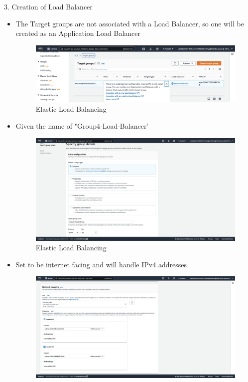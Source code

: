 3. Creation of Load Balancer

\begin{itemize}
    \item The Target groups are not associated with a Load Balancer, so one will be created as an Application Load Balancer
    \begin{figure}[!htbp]
        \centering
        \includegraphics[width=\textwidth]{resources/elb/elb-load-balancer-creation.png}
        \caption{Elastic Load Balancing}
        \label{fig:elb-load-bal-create}
    \end{figure}
    \item Given the name of "Group4-Load-Balancer' \begin{figure}[!htbp]
                                                       \centering
                                                       \includegraphics[width=\textwidth]{resources/elb/elb-target-group-basic-config.png}
                                                       \caption{Elastic Load Balancing}
                                                       \label{fig:elb-target-group-basic-config}
    \end{figure}
    \item Set to be internet facing and will handle IPv4 addresses \begin{figure}[!htbp]
                                                                       \centering
                                                                       \includegraphics[width=\textwidth]{resources/elb/elb-network-mapping.png}

\end{figure}
\end{itemize}

